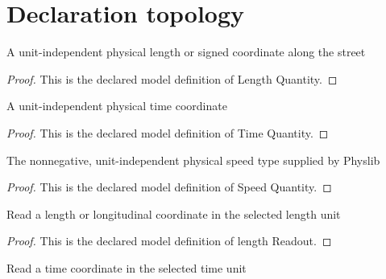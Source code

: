 \section{Declaration topology}
\begin{definition}
  \label{def:physics:phyx-mini-0732:phyxminiproblems-problemphyxmini0732-lengthquantity}
  A unit-independent physical length or signed coordinate along the street
\end{definition}
\begin{proof}
  This is the declared model definition of Length Quantity.
\end{proof}
\begin{definition}
  \label{def:physics:phyx-mini-0732:phyxminiproblems-problemphyxmini0732-timequantity}
  A unit-independent physical time coordinate
\end{definition}
\begin{proof}
  This is the declared model definition of Time Quantity.
\end{proof}
\begin{definition}
  \label{def:physics:phyx-mini-0732:phyxminiproblems-problemphyxmini0732-speedquantity}
  The nonnegative, unit-independent physical speed type supplied by Physlib
\end{definition}
\begin{proof}
  This is the declared model definition of Speed Quantity.
\end{proof}
\begin{definition}
  \label{def:physics:phyx-mini-0732:phyxminiproblems-problemphyxmini0732-lengthreadout}
  Read a length or longitudinal coordinate in the selected length unit
\end{definition}
\begin{proof}
  This is the declared model definition of length Readout.
\end{proof}
\begin{definition}
  \label{def:physics:phyx-mini-0732:phyxminiproblems-problemphyxmini0732-timereadout}
  Read a time coordinate in the selected time unit
\end{definition}
